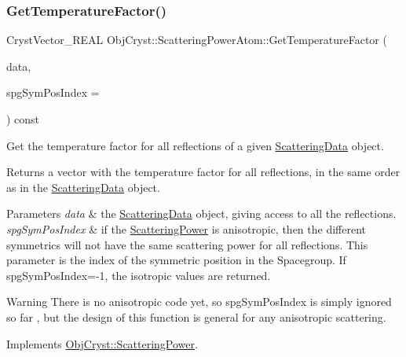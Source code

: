 \subsubsection{\texorpdfstring{GetTemperatureFactor()}{GetTemperatureFactor()}}
{\footnotesize\ttfamily Cryst\+Vector\+\_\+\+R\+E\+AL Obj\+Cryst\+::\+Scattering\+Power\+Atom\+::\+Get\+Temperature\+Factor (\begin{DoxyParamCaption}\item[{const \mbox{\hyperlink{class_obj_cryst_1_1_scattering_data}{Scattering\+Data}} \&}]{data,  }\item[{const int}]{spg\+Sym\+Pos\+Index = {} }\end{DoxyParamCaption}) const\hspace{0.3cm}{\ttfamily [virtual]}}



Get the temperature factor for all reflections of a given \mbox{\hyperlink{class_obj_cryst_1_1_scattering_data}{Scattering\+Data}} object. 

\begin{DoxyReturn}{Returns}
a vector with the temperature factor for all reflections, in the same order as in the \mbox{\hyperlink{class_obj_cryst_1_1_scattering_data}{Scattering\+Data}} object. 
\end{DoxyReturn}

\begin{DoxyParams}{Parameters}
{\em data} & the \mbox{\hyperlink{class_obj_cryst_1_1_scattering_data}{Scattering\+Data}} object, giving access to all the reflections. \\
\hline
{\em spg\+Sym\+Pos\+Index} & if the \mbox{\hyperlink{class_obj_cryst_1_1_scattering_power}{Scattering\+Power}} is anisotropic, then the different symmetrics will not have the same scattering power for all reflections. This parameter is the index of the symmetric position in the Spacegroup. If spg\+Sym\+Pos\+Index=-\/1, the isotropic values are returned. \\
\hline
\end{DoxyParams}
\begin{DoxyWarning}{Warning}
There is no anisotropic code yet, so spg\+Sym\+Pos\+Index is simply ignored so far , but the design of this function is general for any anisotropic scattering. 
\end{DoxyWarning}


Implements \mbox{\hyperlink{class_obj_cryst_1_1_scattering_power_a3df723db77380c82ecff5f7050490255}{Obj\+Cryst\+::\+Scattering\+Power}}.

